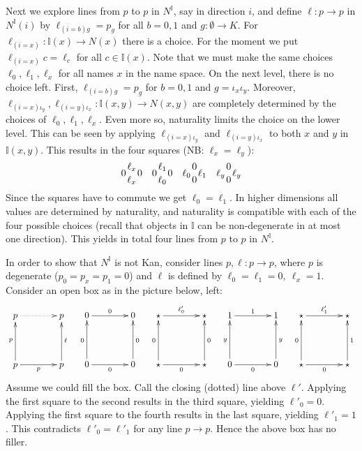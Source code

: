 \documentclass[a4paper,USenglish,draft]{lipics}
\newcommand{\interval}{\mathbb{I}}
\newcommand{\es}{\emptyset}
\begin{document}
Next we explore lines from $p$ to $p$ in $N^\interval$, say in
direction $i$, and define $\ell:p\to p$ in $N^\interval(i)$ by
$\ell_{(i=b)g} = p_g$ for all $b=0,1$ and $g:\es\to K$.  For
$\ell_{(i=x)}: \interval(x)\to N(x)$ there is a choice. For the moment
we put $\ell_{(i=x)} c = \ell_c$ for all $c\in \interval(x)$. Note
that we must make the same choices $\ell_0,\ell_1,\ell_x$ for all
names $x$ in the name space.  On the next level, there is no choice
left.  First, $\ell_{(i=b)g} = p_g$ for $b=0,1$ and
$g=\iota_x\iota_y$.  Moreover,
$\ell_{(i=x)\iota_y},\ell_{(i=y)\iota_x}: \interval(x,y)\to N(x,y)$
are completely determined by the choices of $\ell_0,\ell_1,\ell_x$.
Even more so, naturality limits the choice on the lower level.  This
can be seen by applying $\ell_{(i=x)\iota_y}$ and
$\ell_{(i=y)\iota_x}$ to both $x$ and $y$ in $\interval(x,y)$. This
results in the four squares (NB: $\ell_x=\ell_y$):
\[
0{\ell_x \atop \ell_x}0 \quad 0{\ell_1 \atop \ell_0}0 \quad \ell_0{0
  \atop 0}\ell_1 \quad \ell_y{0 \atop 0}\ell_y
\]
Since the squares have to commute we get $\ell_0 = \ell_1$.  In higher
dimensions all values are determined by naturality, and naturality is
compatible with each of the four possible choices (recall that objects
in $\interval$ can be non-degenerate in at most one direction).  This
yields in total four lines from $p$ to $p$ in $N^\interval$.

In order to show that $N^\interval$ is not Kan, consider lines
$p,\ell: p\to p$, where $p$ is degenerate ($p_0=p_x=p_1=0$) and $\ell$
is defined by $\ell_0=\ell_1=0,~\ell_x=1$.  Consider an open box as in
the picture below, left:
\[
\xymatrix@R=.6cm@C=.6cm{
p\ar@{.>}[rr]&      & p   &  0\ar[rr]^{0}&      & 0  &  \star\ar[rr]^{\ell'_0}&      & \star
&  1\ar[rr]^{1}&      & 1 &  \star\ar[rr]^{\ell'_1}&      & \star \\
                    &&    &        &&    &    &&       &        &&    &    &&       \\
p\ar[rr]_{p}\ar[uu]^{p}& & p\ar[uu]_{\ell} &
0\ar[rr]_{0}\ar[uu]^{0}& & 0\ar[uu]_{0}    &
\star\ar[rr]_{0}\ar[uu]^{0}& & \star\ar[uu]_{0}  &
0\ar[rr]_{0}\ar[uu]^{y}& & 0\ar[uu]_{y}    &
\star\ar[rr]_{0}\ar[uu]^{0}& & \star\ar[uu]_{1}     \\
}
\]
Assume we could fill the box.  Call the closing (dotted) line above
$\ell'$.  Applying the first square to the second results in the third
square, yielding $\ell'_0 = 0$.  Applying the first square to the
fourth results in the last square, yielding $\ell'_1 = 1$.  This
contradicts $\ell'_0 = \ell'_1$ for any line $p\to p$.  Hence the
above box has no filler.
\end{document}
